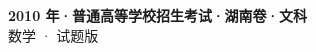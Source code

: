\documentclass[zihao=-4, a4paper]{ctexart}
\begin{document}
\begin{center}
  {\Large\bfseries 2010 年·普通高等学校招生考试·湖南卷·文科}\\[4pt]
  {\large 数学 · 试题版}
\end{center}
\medskip
{}

\end{document}
